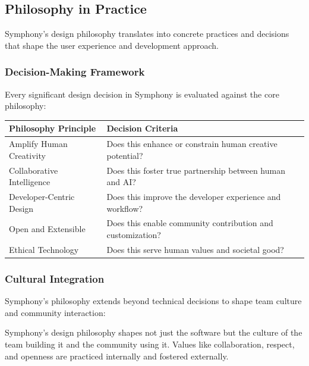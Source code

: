 \subsection{Philosophy in Practice}
\label{subsec:philosophy-in-practice}

Symphony's design philosophy translates into concrete practices and decisions that shape the user experience and development approach.

\subsubsection{Decision-Making Framework}

Every significant design decision in Symphony is evaluated against the core philosophy:

\begin{center}
\begin{tabular}{@{}ll@{}}
\toprule
\textbf{Philosophy Principle} & \textbf{Decision Criteria} \\
\midrule
Amplify Human Creativity & Does this enhance or constrain human creative potential? \\
Collaborative Intelligence & Does this foster true partnership between human and AI? \\
Developer-Centric Design & Does this improve the developer experience and workflow? \\
Open and Extensible & Does this enable community contribution and customization? \\
Ethical Technology & Does this serve human values and societal good? \\
\bottomrule
\end{tabular}
\label{tab:decision-framework}
\end{center}

\subsubsection{Cultural Integration}

Symphony's philosophy extends beyond technical decisions to shape team culture and community interaction:

\begin{infobox}[title=Philosophy as Culture]
Symphony's design philosophy shapes not just the software but the culture of the team building it and the community using it. Values like collaboration, respect, and openness are practiced internally and fostered externally.
\end{infobox}

